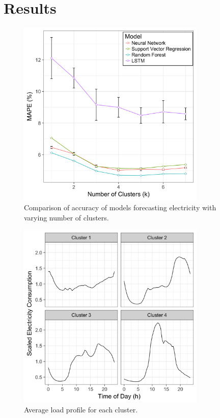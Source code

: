 \section{Results}


\begin{figure}
	\includegraphics[width=0.8\textwidth]{Chapter5/figures/short-term-forecasting/results.png}
	\caption{Comparison of accuracy of models forecasting electricity with varying number of clusters.}
	\label{fig:results}
\end{figure}

\begin{figure}
	\includegraphics[width=0.8\textwidth]{Chapter5/figures/short-term-forecasting/Cluster_Centres.png}
	\caption{Average load profile for each cluster.}
	\label{fig:clustercentre}
\end{figure}

